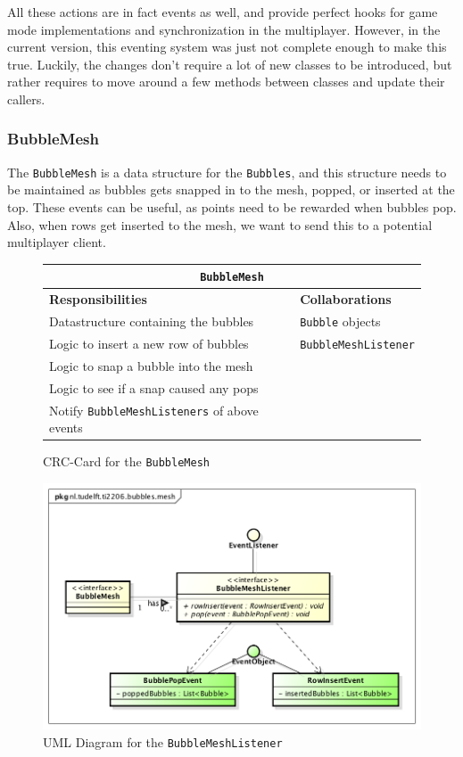 \documentclass[a4paper]{article}
\begin{document}
\par All these actions are in fact events as well, and provide perfect hooks for game mode implementations and  synchronization in the multiplayer. However, in the current version, this eventing system was just not complete enough to make this true. Luckily, the changes don't require a lot of new classes to be introduced, but rather requires to move around a few methods between classes and update their callers.

\subsubsection*{BubbleMesh}
The \texttt{BubbleMesh} is a data structure for the \texttt{Bubbles}, and this structure needs to be maintained as bubbles gets snapped in to the mesh, popped, or inserted at the top. These events can be useful, as points need to be rewarded when bubbles pop. Also, when rows get inserted to the mesh, we want to send this to a potential multiplayer client.

\begin{figure}[H]
    \begin{center}
    \begin{tabular}{ | p{8cm} | p{4cm} | }
      \multicolumn{2}{c}{\texttt{BubbleMesh}} \\ \hline
      \textbf{Responsibilities} & \textbf{Collaborations} \\ \hline
      Datastructure containing the bubbles & \texttt{Bubble} objects \\
      Logic to insert a new row of bubbles & \texttt{BubbleMeshListener} \\
      Logic to snap a bubble into the mesh & \\
      Logic to see if a snap caused any pops & \\
      Notify \texttt{BubbleMeshListeners} of above events & \\
      \hline
    \end{tabular}
    \end{center}
    \caption{CRC-Card for the \texttt{BubbleMesh}}
\end{figure}

\begin{figure}[H]
    \centering
	\includegraphics[scale=0.5]{BubbleMeshListener.png}
    \caption{UML Diagram for the \texttt{BubbleMeshListener}}
\end{figure}
\end{document}
